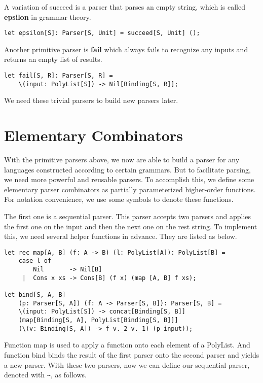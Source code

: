 A variation of succeed is a parser that parses an empty string, which is called \textbf{epsilon} in grammar theory.

\begin{lstlisting}
let epsilon[S]: Parser[S, Unit] = succeed[S, Unit] ();
\end{lstlisting}

Another primitive parser is \textbf{fail} which always fails to recognize any inputs and returns an empty list of results.

\begin{lstlisting}
let fail[S, R]: Parser[S, R] =
	\(input: PolyList[S]) -> Nil[Binding[S, R]];
\end{lstlisting}

We need these trivial parsers to build new parsers later.

\section{Elementary Combinators}
With the primitive parsers above, we now are able to build a parser for any languages constructed according to certain grammars. But to facilitate parsing, we need more powerful and reusable parsers. To accomplish this, we define some elementary parser combinators as partially parameterized higher-order functions. For notation convenience, we use some symbols to denote these functions.

The first one is a sequential parser. This parser accepts two parsers and applies the first one on the input and then the next one on the rest string. To implement this, we need several helper functions in advance. They are listed as below.

\begin{lstlisting}
let rec map[A, B] (f: A -> B) (l: PolyList[A]): PolyList[B] =
    case l of
        Nil       -> Nil[B]
     |  Cons x xs -> Cons[B] (f x) (map [A, B] f xs);

let bind[S, A, B]
    (p: Parser[S, A]) (f: A -> Parser[S, B]): Parser[S, B] =
    \(input: PolyList[S]) -> concat[Binding[S, B]]
    (map[Binding[S, A], PolyList[Binding[S, B]]]
    (\(v: Binding[S, A]) -> f v._2 v._1) (p input));
\end{lstlisting}

Function map is used to apply a function onto each element of a PolyList. And function bind binds the result of the first parser onto the second parser and yields a new parser. With these two parsers, now we can define our sequential parser, denoted with \texttt{\textasciitilde}, as follows.

